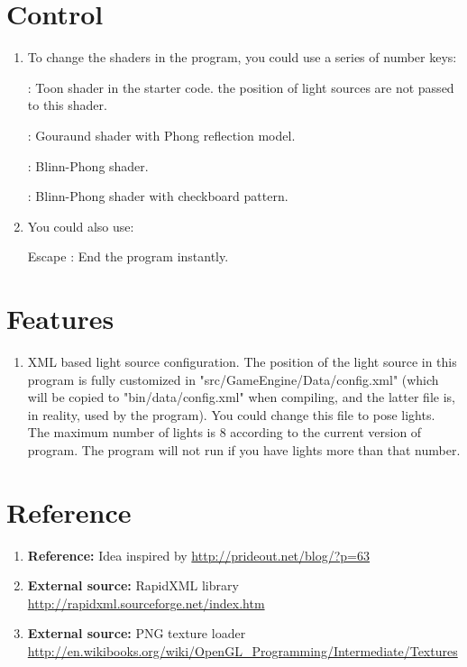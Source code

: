 \documentclass{article}
\begin{document}
\section{Control}

\begin{enumerate}[\hspace{5pt}]
	
	\item To change the shaders in the program, you could use a series of number keys:
		
		{\hspace{5pt}} : Toon shader in the starter code. the position of light sources are not passed to this shader.

		{\hspace{5pt}} : Gouraund shader with Phong reflection model.

		{\hspace{5pt}} : Blinn-Phong shader.

		{\hspace{5pt}} : Blinn-Phong shader with checkboard pattern.

	\item You could also use:

		{\hspace{5pt}\ttfamily Escape} : End the program instantly.

\end{enumerate}

\section{Features}

	\begin{enumerate}
		\item XML based light source configuration.
			The position of the light source in this program is fully customized in "src/GameEngine/Data/config.xml" (which will be copied to "bin/data/config.xml" when compiling, and the latter file is, in reality, used by the program).
			You could change this file to pose lights.
			The maximum number of lights is 8 according to the current version of program.
			The program will not run if you have lights more than that number.

	\end{enumerate}

\section{Reference}
	\begin{enumerate}
		\item {\bf Reference:} Idea inspired by \url{http://prideout.net/blog/?p=63}
		\item {\bf External source:} RapidXML library \url{http://rapidxml.sourceforge.net/index.htm}
		\item {\bf External source:} PNG texture loader \url{http://en.wikibooks.org/wiki/OpenGL_Programming/Intermediate/Textures}
	\end{enumerate}
\end{document}
